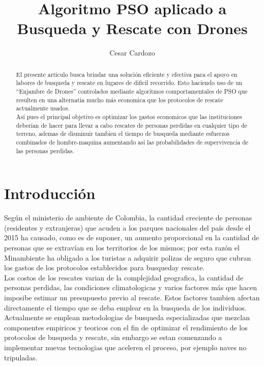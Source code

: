\documentclass[journal]{IEEEtran}
\author{Cesar Cardozo}
\title{Algoritmo PSO aplicado a Busqueda y Rescate con Drones}
\begin{document}
\maketitle
\begin{abstract}
El presente articulo busca brindar una solución eficiente y efectiva para el apoyo en labores de busqueda y rescate en lugares de dificil recorrido. Esto haciendo uso de un ``Enjambre de Drones'' controlados mediante algoritmos comportamentales de PSO que resulten en una alternatia mucho más economica que los protocolos de rescate actualmente usados.\\

Así pues el principal objetivo es optimizar los gastos economicos que las instituciones deberían de hacer para llevar a cabo rescates de personas perdidas en cualquier tipo de terreno, ademas de disminuir tambien el tiempo de busqueda mediante esfuerzos combinados de hombre-maquina aumentando así las probabilidades de supervivencia de las personas perdidas.
\end{abstract}
\section{Introducción}
Según el ministerio de ambiente de Colombia, la cantidad creciente de personas (residentes y extranjeras) que acuden a los parques nacionales del país desde el 2015 ha causado, como es de suponer, un aumento proporcional en la cantidad de personas que se extravían en los territorios de los mismos; por esta razón el Minambiente ha obligado a los turistas a adquirir polizas de seguro que cubran los gastos de los protocolos establecidos para busqueday rescate.\\

Los costos de los rescates varian de la complejidad geografica, la cantidad de personas perdidas, las condiciones climatologicas y varios factores más que hacen imposibe estimar un presupuesto previo al rescate. Estos factores tambien afectan directamente el tiempo que se deba emplear en la busqueda de los individuos.\\

Actualmente se emplean metodologias de busqueda especializadas que mezclan componentes empiricos y teoricos con el fin de optimizar el rendimiento de los protocolos de busqueda y rescate, sin embargo se estan comenzando a implementar nuevas tecnologias que aceleren el proceso, por ejemplo naves no tripuladas.\\
\end{document}
